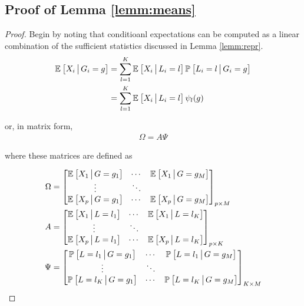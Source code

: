 \documentclass{article}
\theoremstyle{plain}
\theoremstyle{definition}
\theoremstyle{remark}
\begin{document}
\subsection{Proof of Lemma \ref{lemm:means}}

\begin{proof}
\label{proof:means}
Begin by noting that conditioanl expectations can be computed as a linear combination of the sufficient statistics discussed in Lemma \ref{lemm:repr}.
\begin{align}
    \mathbb{E}_{}\left[ X_{i} \,\big|\, G_{i} = g\right]
    &= \sum_{l=1}^{K} \mathbb{E}_{}\left[X_{i} \,\big|\, L_{i} = l\right] \mathbb{P}_{}\left[L_{i} = l \,\big|\, G_{i} = g\right] \\
    &= \sum_{l=1}^{K} \mathbb{E}_{}\left[X_{i} \,\big|\, L_{i} = l\right] \psi_{l}(g)
    \label{eq:scalar_decomposition}
\end{align}

\noindent or, in matrix form,
\begin{align}
    \Omega = A\Psi
    \label{eq:matrix_decomposition}
\end{align}

\noindent where these matrices are defined as

\begin{align}
    \Omega &=
    \begin{bmatrix}
        \mathbb{E}_{}\left[X_{1} \,\big|\, G=g_{1}\right] & \cdots & \mathbb{E}_{}\left[X_{1} \,\big|\, G=g_{M}\right] \\
                \vdots     &  \ddots &  \\
        \mathbb{E}_{}\left[X_{p} \,\big|\, G=g_{1}\right] & \cdots & \mathbb{E}_{}\left[X_{p} \,\big|\, G=g_{M}\right] \\
    \end{bmatrix}_{p\times M}
    \label{eq:matrix_omega}
\\
    A &=
    \begin{bmatrix}
        \mathbb{E}_{}\left[X_{1} \,\big|\, L=l_{1}\right] & \cdots & \mathbb{E}_{}\left[X_{1} \,\big|\, L=l_{K}\right] \\
                \vdots     &  \ddots &  \\
        \mathbb{E}_{}\left[X_{p} \,\big|\, L=l_{1}\right] & \cdots & \mathbb{E}_{}\left[X_{p} \,\big|\, L=l_{K}\right] \\
    \end{bmatrix}_{p\times K}
    \label{eq:matrix_a}
\\
    \Psi &=
    \begin{bmatrix}
        \mathbb{P}_{}\left[L = l_{1} \,\big|\, G=g_{1}\right] & \cdots & \mathbb{P}_{}\left[L = l_{1} \,\big|\, G=g_{M}\right] \\
                \vdots     &  \ddots &  \\
        \mathbb{P}_{}\left[L = l_{K} \,\big|\, G=g_{1}\right] & \cdots & \mathbb{P}_{}\left[ L = l_{K} \,\big|\, G=g_{M}\right] \\
    \end{bmatrix}_{K\times M}
    \label{eq:matrix_psi}
\end{align}


\end{proof}
\end{document}

